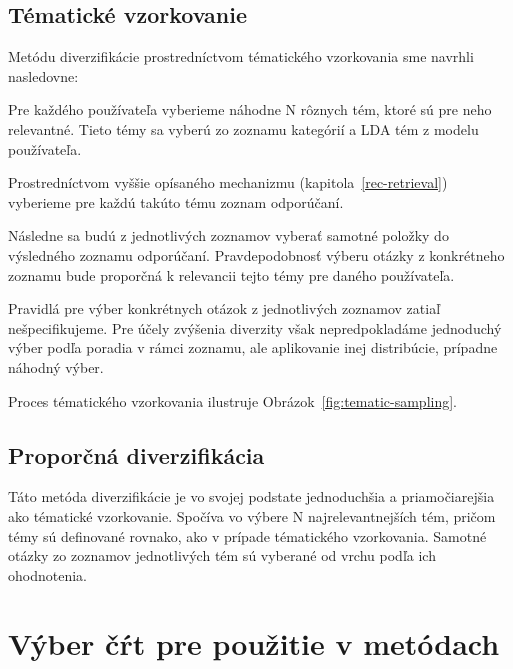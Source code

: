 \subsection{Tématické vzorkovanie}
Metódu diverzifikácie prostredníctvom tématického vzorkovania sme navrhli nasledovne:

\begin{my_enumerate}
\item{
  Pre každého používateľa vyberieme náhodne N rôznych tém, ktoré sú pre neho relevantné. Tieto témy sa vyberú zo zoznamu
  kategórií a LDA tém z modelu používateľa.
}
\item{
  Prostredníctvom vyššie opísaného mechanizmu (kapitola~\ref{rec-retrieval}) vyberieme pre každú takúto tému zoznam
  odporúčaní.
}
\item{
  Následne sa budú z jednotlivých zoznamov vyberať samotné položky do výsledného zoznamu odporúčaní. Pravdepodobnosť výberu
  otázky z konkrétneho zoznamu bude proporčná k relevancii tejto témy pre daného používateľa.
}
\item{
  Pravidlá pre výber konkrétnych otázok z jednotlivých zoznamov zatiaľ nešpecifikujeme. Pre účely zvýšenia diverzity však
  nepredpokladáme jednoduchý výber podľa poradia v rámci zoznamu, ale aplikovanie inej distribúcie, prípadne náhodný výber.
}
\end{my_enumerate}

Proces tématického vzorkovania ilustruje Obrázok~\ref{fig:tematic-sampling}.


\subsection{Proporčná diverzifikácia}
Táto metóda diverzifikácie je vo svojej podstate jednoduchšia a priamočiarejšia ako tématické vzorkovanie. Spočíva
vo výbere N najrelevantnejších tém, pričom témy sú definované rovnako, ako v prípade tématického vzorkovania.
Samotné otázky zo zoznamov jednotlivých tém sú vyberané od vrchu podľa ich ohodnotenia.


\section{Výber čŕt pre použitie v metódach}\label{features}

